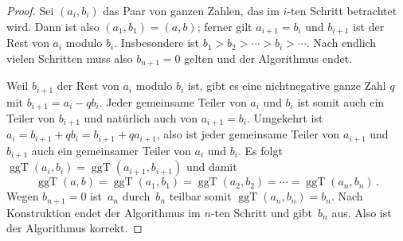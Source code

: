 \begin{proof}
	Sei $(a_i,b_i)$ das Paar von ganzen Zahlen, das im $i$-ten Schritt betrachtet wird. Dann ist also $(a_1,b_1)=(a,b)$; ferner gilt $a_{i+1}=b_i$ und $b_{i+1}$ ist der Rest von $a_i$ modulo $b_i$. Insbesondere ist $b_1>b_2>\dotsb>b_i>\dotsb$. Nach endlich vielen Schritten muss also $b_{n+1}=0$ gelten und der Algorithmus endet.
	
	Weil $b_{i+1}$ der Rest von $a_i$ modulo $b_i$ ist, gibt es eine nichtnegative ganze Zahl $q$ mit $b_{i+1}=a_i-qb_i$. Jeder gemeinsame Teiler von $a_i$ und $b_i$ ist somit auch ein Teiler von $b_{i+1}$ und natürlich auch von $a_{i+1}=b_i$. Umgekehrt ist $a_i=b_{i+1}+qb_i=b_{i+1}+qa_{i+1}$, also ist jeder gemeinsame Teiler von $a_{i+1}$ und $b_{i+1}$ auch ein gemeinsamer Teiler von $a_i$ und $b_i$. Es folgt $\operatorname{ggT}(a_i,b_i)=\operatorname{ggT}(a_{i+1},b_{i+1})$ und damit
	\begin{equation*}
		\operatorname{ggT}(a,b)=\operatorname{ggT}(a_1,b_1)=\operatorname{ggT}(a_2,b_2)=\dotsb=\operatorname{ggT}(a_n,b_n)\,.
	\end{equation*}
	Wegen $b_{n+1}=0$ ist~$a_n$ durch~$b_n$ teilbar somit $\operatorname{ggT}(a_n,b_n)=b_n$. Nach Konstruktion endet der Algorithmus im $n$-ten Schritt und gibt~$b_n$ aus. Also ist der Algorithmus korrekt.
\end{proof}

